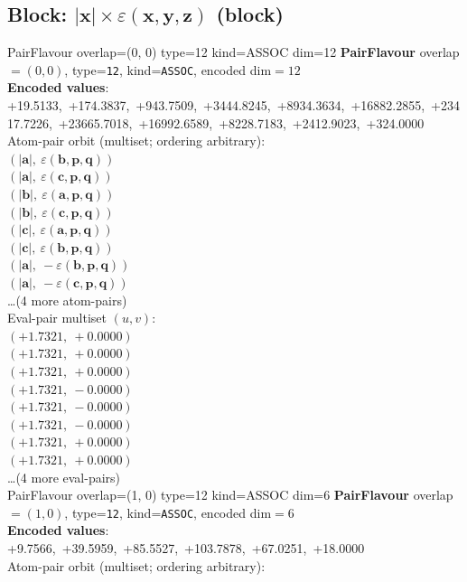 \documentclass[a4paper,11pt]{article}
\newcommand{\vc}[1]{\ensuremath{\mathbf{#1}}}
\newcommand{\dnfagmiihhiejm}[1]{|\vc{#1}|}
\newcommand{\kblbmcpggoncpf}[3]{\varepsilon(\mathbf{#1},\mathbf{#2},\mathbf{#3})}
\begin{document}
\subsection{Block: $\dnfagmiihhiejm{x} \times \kblbmcpggoncpf{x}{y}{z}$  (block)}
    PairFlavour  overlap=(0, 0)  type=12  kind=ASSOC  dim=12
\textbf{PairFlavour} overlap$=(0, 0)$, type=\texttt{12}, kind=\texttt{ASSOC}, encoded dim$=12$\\
\textbf{      Encoded values}: +19.5133,\ +174.3837,\ +943.7509,\ +3444.8245,\ +8934.3634,\ +16882.2855,\ +23417.7226,\ +23665.7018,\ +16992.6589,\ +8228.7183,\ +2412.9023,\ +324.0000\\
\quad Atom-pair orbit (multiset; ordering arbitrary):\\
$(\dnfagmiihhiejm{a},\ \kblbmcpggoncpf{b}{p}{q})$\\
$(\dnfagmiihhiejm{a},\ \kblbmcpggoncpf{c}{p}{q})$\\
$(\dnfagmiihhiejm{b},\ \kblbmcpggoncpf{a}{p}{q})$\\
$(\dnfagmiihhiejm{b},\ \kblbmcpggoncpf{c}{p}{q})$\\
$(\dnfagmiihhiejm{c},\ \kblbmcpggoncpf{a}{p}{q})$\\
$(\dnfagmiihhiejm{c},\ \kblbmcpggoncpf{b}{p}{q})$\\
$(\dnfagmiihhiejm{a},\ -\kblbmcpggoncpf{b}{p}{q})$\\
$(\dnfagmiihhiejm{a},\ -\kblbmcpggoncpf{c}{p}{q})$\\
\quad \ldots (4 more atom-pairs)\\
\quad Eval-pair multiset $(u, v)$:\\
$(+1.7321,\ +0.0000)$\\
$(+1.7321,\ +0.0000)$\\
$(+1.7321,\ +0.0000)$\\
$(+1.7321,\ -0.0000)$\\
$(+1.7321,\ -0.0000)$\\
$(+1.7321,\ -0.0000)$\\
$(+1.7321,\ +0.0000)$\\
$(+1.7321,\ +0.0000)$\\
\quad \ldots (4 more eval-pairs)\\
    PairFlavour  overlap=(1, 0)  type=12  kind=ASSOC  dim=6
\textbf{PairFlavour} overlap$=(1, 0)$, type=\texttt{12}, kind=\texttt{ASSOC}, encoded dim$=6$\\
\textbf{      Encoded values}: +9.7566,\ +39.5959,\ +85.5527,\ +103.7878,\ +67.0251,\ +18.0000\\
\quad Atom-pair orbit (multiset; ordering arbitrary):\\
\end{document}
